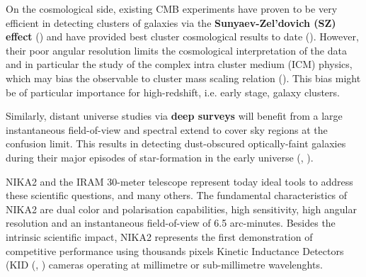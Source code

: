 \documentclass[]{aa} %
\begin{document}
On the cosmological side, existing CMB experiments have proven to be very efficient in detecting clusters of galaxies via the \textbf{Sunyaev-Zel\textquoteright dovich (SZ) effect} (\cite{plancksz2,actsz,sptsz}) and have provided best cluster cosmological results to date (\cite{plancksp2,plancknc2}). However, their poor angular resolution limits the cosmological interpretation of the data and in particular the study of the complex intra cluster medium (ICM) physics, which may bias the observable to cluster mass scaling relation (\cite{plancknc2}). This bias might be of particular importance for high-redshift, i.e. early stage, galaxy clusters. 

Similarly, distant universe studies via \textbf{deep surveys} will benefit from a large instantaneous field-of-view and spectral extend to cover sky regions at the confusion limit. This results in detecting dust-obscured optically-faint galaxies during their major episodes of star-formation in the early universe (\cite{Bethermin2017}, \cite{Geach2017}). 

NIKA2 and the IRAM 30-meter telescope represent today ideal tools to address these scientific questions, and many others. The fundamental characteristics of NIKA2 are dual color and polarisation capabilities, high sensitivity, high angular resolution and an instantaneous field-of-view of 6.5 arc-minutes. Besides the intrinsic scientific impact, NIKA2 represents the first demonstration of competitive performance using thousands pixels Kinetic Inductance Detectors (KID (\cite{Day2003}, \cite{Doyle2010}) cameras operating at millimetre or sub-millimetre wavelenghts.

\end{document}
